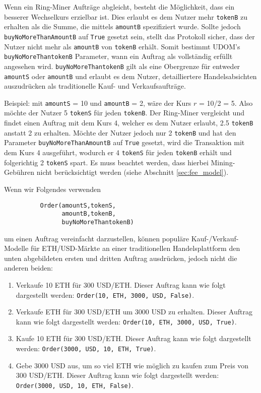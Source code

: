 \documentclass[UTF8,nofonts]{article}
\begin{document}
\begin{multicols}{2}
Wenn ein Ring-Miner Aufträge abgleicht, besteht die Möglichkeit, dass ein besserer Wechselkurs erzielbar ist. Dies erlaubt es dem Nutzer mehr \verb|tokenB| zu erhalten als die Summe, die mittels \verb|amountB| spezifiziert wurde. Sollte jedoch \verb|buyNoMoreThanAmountB| auf \verb|True| gesetzt sein, stellt das Protokoll sicher, dass der Nutzer nicht mehr als \verb|amountB| von \verb|tokenB| erhält. Somit bestimmt UDOM's \verb|buyNoMoreThantokenB| Parameter, wann ein Auftrag als vollständig erfüllt angesehen wird. \verb|buyNoMoreThantokenB| gilt als eine Obergrenze für entweder \verb|amountS| oder \verb|amountB| und erlaubt es dem Nutzer, detailliertere Handelsabsichten auszudrücken als traditionelle Kauf- und Verkaufsaufträge.

Beispiel: mit \verb|amountS| = 10 und \verb|amountB| = 2, wäre der Kurs $r$ = 10/2 = 5. Also möchte der Nutzer 5 \verb|tokenS| für jeden \verb|tokenB|. Der Ring-Miner vergleicht und findet einen Auftrag mit dem Kurs 4, welcher es dem Nutzer erlaubt, 2.5 \verb|tokenB| anstatt 2 zu erhalten. Möchte der Nutzer jedoch nur 2 \verb|tokenB| und hat den Parameter \verb|buyNoMoreThanAmountB| auf \verb|True| gesetzt, wird die Transaktion mit dem Kurs 4 ausgeführt, wodurch er 4 \verb|tokenS| für jeden \verb|tokenB| erhält und folgerichtig 2 \verb|tokenS| spart. Es muss beachtet werden, dass hierbei Mining-Gebühren nicht berücksichtigt werden (siehe Abschnitt \ref{sec:fee_model}).

Wenn wir Folgendes verwenden


\begin{verbatim}
	      Order(amountS,tokenS,
	            amountB,tokenB,
	            buyNoMoreThantokenB)
\end{verbatim}

um einen Auftrag vereinfacht darzustellen, können populäre Kauf-/Verkauf-Modelle für ETH/USD-Märkte an einer traditionellen Handelsplattform den unten abgebildeten ersten und dritten Auftrag ausdrücken, jedoch nicht die anderen beiden:

\begin{enumerate}
	\item Verkaufe 10 ETH für 300 USD/ETH. Dieser Auftrag kann wie folgt dargestellt werden: \verb|Order(10, ETH, 3000, USD, False)|.
	\item Verkaufe ETH für 300 USD/ETH um 3000 USD zu erhalten. Dieser Auftrag kann wie folgt dargestellt werden: \verb|Order(10, ETH, 3000, USD, True)|.
	\item Kaufe 10 ETH für 300 USD/ETH. Dieser Auftrag kann wie folgt dargestellt werden: \verb|Order(3000, USD, 10, ETH, True)|.
	\item Gebe 3000 USD aus, um so viel ETH wie möglich zu kaufen zum Preis von 300 USD/ETH. Dieser Auftrag kann wie folgt dargestellt werden: \verb|Order(3000, USD, 10, ETH, False)|.
\end{enumerate}




\end{multicols}
\end{document}
